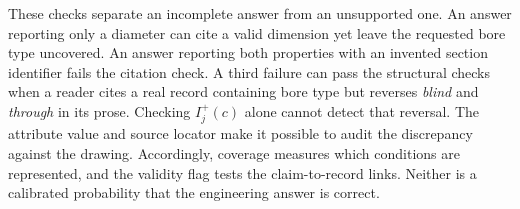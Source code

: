 These checks separate an incomplete answer from an unsupported one. An answer reporting only a diameter can cite a valid dimension yet leave the requested bore type uncovered. An answer reporting both properties with an invented section identifier fails the citation check. A third failure can pass the structural checks when a reader cites a real record containing bore type but reverses \emph{blind} and \emph{through} in its prose. Checking $I_j^+(c)$ alone cannot detect that reversal. The attribute value and source locator make it possible to audit the discrepancy against the drawing. Accordingly, coverage measures which conditions are represented, and the validity flag tests the claim-to-record links. Neither is a calibrated probability that the engineering answer is correct.
